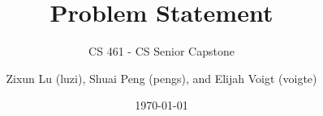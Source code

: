 



\title{Problem Statement}
\subtitle{CS 461 - CS Senior Capstone}
\author{
  Zixun Lu (luzi),
  Shuai Peng (pengs), and
  Elijah Voigt (voigte)
}
\date{\today}
\maketitle
\begin{abstract}
  
\end{abstract}









